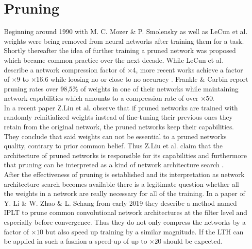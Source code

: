 \section{Pruning}
Beginning around 1990 with M. C. Mozer \& P. Smolensky \cite{Skeletonization} as well as LeCun et al. \cite{Optimal-Brain-Damage} weights were being removed from neural networks after training them for a task. Shortly thereafter the idea of further training a pruned network was proposed \cite{Optimal-Brain-Surgeon} which became common practice over the next decade. While LeCun et al. describe a network compression factor of $\times4$, more recent works achieve a factor of $\times9$ to $\times16.6$ while loosing no or close to no accuracy \cite{Learning_Weights_And_Connections} \cite{ThiNet}. Frankle \& Carbin report pruning rates over 98,5\% of weights in one of their networks while maintaining network capabilities which amounts to a compression rate of over $\times50$. \cite{LTH}
\\
In a recent paper \cite{Rethinking-Network-Pruning} Z.Liu et al. observe that if pruned networks are trained with randomly reinitialized weights instead of fine-tuning their previous ones they retain from the original network, the pruned networks keep their capabilities. They conclude that said weights can not be essential to a pruned networks quality, contrary to prior common belief. Thus Z.Liu et al. claim that the architecture of pruned networks is responsible for its capabilities and furthermore that pruning can be interpreted as a kind of network architecture search .\\
After the effectiveness of pruning is established and its interpretation as network architecture search becomes available there is a legitimate question whether all the weights in a network are really necessary for all of the training. In a paper of Y. Li \& W. Zhao \& L. Schang from early 2019 \cite{Pruning-With-Little-Training} they describe a method named IPLT to prune common convolutional network architectures at the filter level and especially before convergence. Thus they do not only compress the networks by a factor of $\times10$ but also speed up training by a similar magnitude. If the LTH can be applied in such a fashion a speed-up of up to $\times20$ should be expected.

